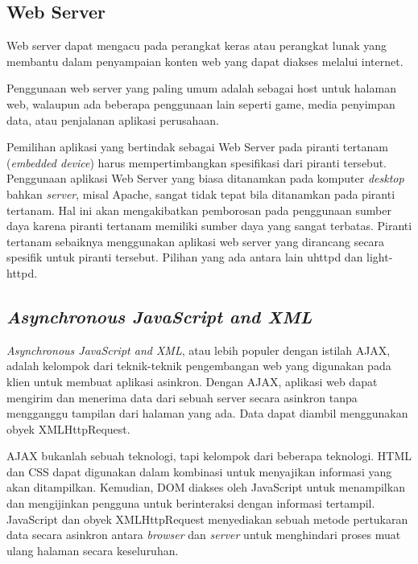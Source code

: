   \subsection{Web Server}
    Web server dapat mengacu pada perangkat keras atau perangkat lunak yang membantu dalam penyampaian konten web yang dapat diakses melalui internet.

    Penggunaan web server yang paling umum adalah sebagai host untuk halaman web, walaupun ada beberapa penggunaan lain seperti game, media penyimpan data, atau penjalanan aplikasi perusahaan.

    Pemilihan aplikasi yang bertindak sebagai Web Server pada piranti tertanam (\emph{embedded device}) harus mempertimbangkan spesifikasi dari piranti tersebut. Penggunaan aplikasi Web Server yang biasa ditanamkan pada komputer \emph{desktop} bahkan \emph{server}, misal Apache, sangat tidak tepat bila ditanamkan pada piranti tertanam. Hal ini akan mengakibatkan pemborosan pada penggunaan sumber daya karena piranti tertanam memiliki sumber daya yang sangat terbatas. Piranti tertanam sebaiknya menggunakan aplikasi web server yang dirancang secara spesifik untuk piranti tersebut. Pilihan yang ada antara lain uhttpd dan light-httpd.


  \subsection{\emph{Asynchronous JavaScript and XML}}
    \emph{Asynchronous JavaScript and XML}, atau lebih populer dengan istilah AJAX, adalah kelompok dari teknik-teknik pengembangan web yang digunakan pada klien untuk membuat aplikasi asinkron. Dengan AJAX, aplikasi web dapat mengirim dan menerima data dari sebuah server secara asinkron tanpa mengganggu tampilan dari halaman yang ada. Data dapat diambil menggunakan obyek XMLHttpRequest.

    AJAX bukanlah sebuah teknologi, tapi kelompok dari beberapa teknologi. HTML dan CSS dapat digunakan dalam kombinasi untuk menyajikan informasi yang akan ditampilkan. Kemudian, DOM diakses oleh JavaScript untuk menampilkan dan mengijinkan pengguna untuk berinteraksi dengan informasi tertampil. JavaScript dan obyek XMLHttpRequest menyediakan sebuah metode pertukaran data secara asinkron antara \emph{browser} dan \emph{server} untuk menghindari proses muat ulang halaman secara keseluruhan.


